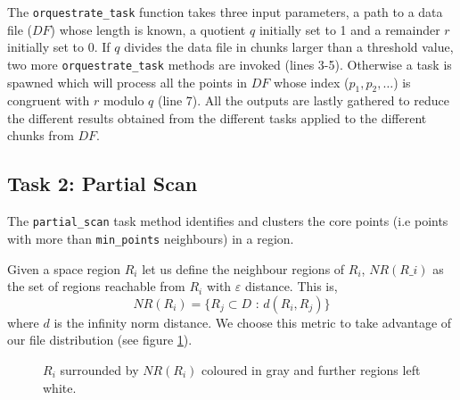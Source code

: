\documentclass[10pt,journal,compsoc]{IEEEtran}
\let\MYoriglatexcaption\caption
\renewcommand{\caption}[2][\relax]{\MYoriglatexcaption[#2]{#2}}
\begin{document}
The \texttt{orquestrate\_task} function takes three input parameters, a path to a data file ($DF$) whose length is known, a quotient $q$ initially set to 1 and a remainder $r$ initially set to $0$. If $q$ divides the data file in chunks larger than a threshold value, two more \texttt{orquestrate\_task} methods are invoked (lines 3-5). Otherwise a task is spawned which will process all the points in $DF$ whose index ($p_1, p_2, \dots$) is congruent with $r$ modulo $q$ (line 7). All the outputs are lastly gathered to reduce the different results obtained from the different tasks applied to the different chunks from $DF$.

\subsection{Task 2: Partial Scan} \label{sec:partial-scan}
The \texttt{partial\_scan} task method identifies and clusters the core points (i.e points with more than \texttt{min\_points} neighbours) in a region.

Given a space region $R_i$ let us define the neighbour regions of $R_i$, $NR(R\_i)$ as the set of regions reachable from $R_i$ with $\varepsilon$ distance. This is,
$$ NR(R_i) = \lbrace R_j \subset D \text{ : } d(R_i, R_j) \rbrace $$
where $d$ is the infinity norm distance. We choose this metric to take advantage of our file distribution (see figure \ref{fig:neigh-loc}).

\begin{figure}[!ht]
\centering
{}
\caption{$R_i$ surrounded by $NR(R_i)$ coloured in gray and further regions left white. \label{fig:neigh-loc}}
\end{figure}
\end{document}
